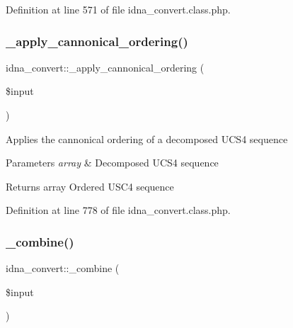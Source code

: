 Definition at line 571 of file idna\+\_\+convert.\+class.\+php.

\hypertarget{classidna__convert_a3e0f3eceeb2987f2b69b9a3cf6f7181a}{}\label{classidna__convert_a3e0f3eceeb2987f2b69b9a3cf6f7181a} 
\subsubsection{\texorpdfstring{\+\_\+apply\+\_\+cannonical\+\_\+ordering()}{\_apply\_cannonical\_ordering()}}
{\footnotesize\ttfamily idna\+\_\+convert\+::\+\_\+apply\+\_\+cannonical\+\_\+ordering (\begin{DoxyParamCaption}\item[{}]{\$input }\end{DoxyParamCaption})\hspace{0.3cm}{\ttfamily [protected]}}

Applies the cannonical ordering of a decomposed U\+C\+S4 sequence 
\begin{DoxyParams}{Parameters}
{\em array} & Decomposed U\+C\+S4 sequence \\
\hline
\end{DoxyParams}
\begin{DoxyReturn}{Returns}
array Ordered U\+S\+C4 sequence 
\end{DoxyReturn}


Definition at line 778 of file idna\+\_\+convert.\+class.\+php.

\hypertarget{classidna__convert_a751b0b8bfacdc3b79eb77018a508363d}{}\label{classidna__convert_a751b0b8bfacdc3b79eb77018a508363d} 
\subsubsection{\texorpdfstring{\+\_\+combine()}{\_combine()}}
{\footnotesize\ttfamily idna\+\_\+convert\+::\+\_\+combine (\begin{DoxyParamCaption}\item[{}]{\$input }\end{DoxyParamCaption})\hspace{0.3cm}{\ttfamily [protected]}}

